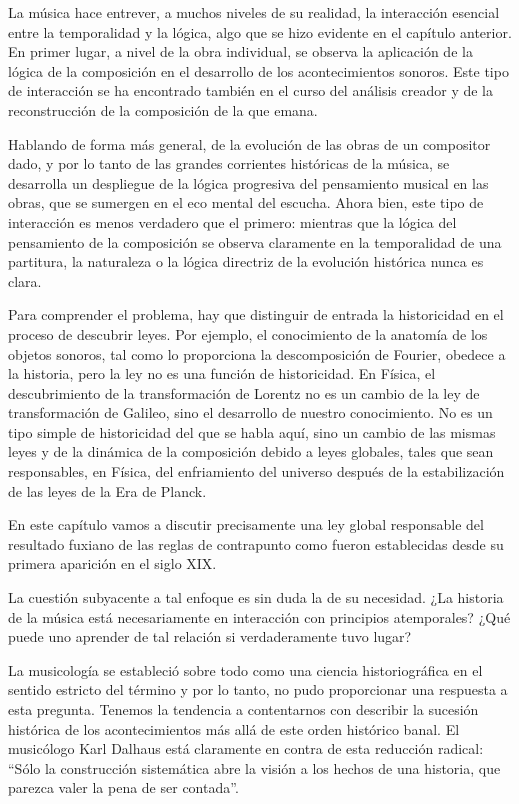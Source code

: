 \documentclass[letterpaper,12pt]{book}
\theoremstyle{definition} \newtheorem{Def}{Definición}[chapter]
\theoremstyle{definition} \newtheorem{Teo}{Teorema}[chapter]
\theoremstyle{definition} \newtheorem{Pro}{Proposición}[chapter]
\theoremstyle{definition} \newtheorem{Lema}{Lema}[chapter]
\begin{document}
La música hace entrever, a muchos niveles de su realidad, la interacción esencial entre la temporalidad y la lógica, algo que se hizo evidente en el capítulo anterior. En primer lugar, a nivel de la obra individual, se observa la aplicación de la lógica de la composición en el desarrollo de los acontecimientos sonoros. Este tipo de interacción se ha encontrado también en el curso del análisis creador y de la reconstrucción de la composición de la que emana. 

Hablando de forma más general, de la evolución de las obras de un compositor dado, y por lo tanto de las grandes corrientes históricas de la música, se desarrolla un despliegue de la lógica progresiva del pensamiento musical en las obras, que se sumergen en el eco mental del escucha. Ahora bien, este tipo de interacción es menos verdadero que el primero:  mientras que la lógica del pensamiento de la composición se observa claramente en la temporalidad de una partitura, la naturaleza o la lógica directriz de la evolución histórica nunca es clara.

Para comprender el problema, hay que distinguir de entrada la historicidad en el proceso de descubrir leyes. Por ejemplo, el conocimiento de la anatomía de los objetos sonoros, tal como lo proporciona la descomposición de Fourier, obedece a la historia, pero la ley no es una función de historicidad. En Física, el descubrimiento de la transformación de Lorentz no es un cambio de la ley de transformación de Galileo, sino el desarrollo de nuestro conocimiento. No es un tipo simple de historicidad del que se habla aquí, sino un cambio de las mismas leyes y de la dinámica de la composición debido a leyes globales, tales que sean responsables, en Física, del enfriamiento del universo después de la estabilización de las leyes de la Era de Planck.   

En este capítulo vamos a discutir precisamente una ley global responsable del resultado fuxiano de las reglas de contrapunto como fueron establecidas desde su primera aparición en el siglo XIX.

La cuestión subyacente a tal enfoque es sin duda la de su necesidad. ¿La historia de la música está necesariamente en interacción con principios atemporales? ¿Qué puede uno aprender de tal relación si verdaderamente tuvo lugar?

La musicología se estableció sobre todo como una ciencia historiográfica en el sentido estricto del término y por lo tanto, no pudo proporcionar una respuesta a esta pregunta. Tenemos la tendencia a contentarnos con describir la sucesión histórica de los acontecimientos más allá de este orden histórico banal. El musicólogo Karl Dalhaus está claramente en contra de esta reducción radical: ``Sólo la construcción sistemática abre la visión a los hechos de una historia, que parezca valer la pena de ser contada''\cite{Verite}.
 
\end{document}
